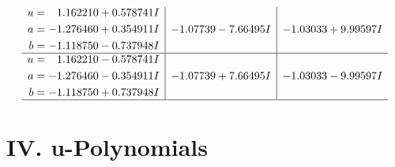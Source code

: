 \documentclass[1p]{elsarticle_modified}
\theoremstyle{definition}
\begin{document}
$$\begin{array}{c|c|c}
\begin{aligned}
u &= \phantom{-}1.162210 + 0.578741 I \\
a &= -1.276460 + 0.354911 I \\
b &= -1.118750 - 0.737948 I\end{aligned}
 & -1.07739 - 7.66495 I & -1.03033 + 9.99597 I \\ \hline\begin{aligned}
u &= \phantom{-}1.162210 - 0.578741 I \\
a &= -1.276460 - 0.354911 I \\
b &= -1.118750 + 0.737948 I\end{aligned}
 & -1.07739 + 7.66495 I & -1.03033 - 9.99597 I\\
 \hline 
 \end{array}$$\newpage
\newpage\renewcommand{\arraystretch}{1}
\centering \section*{ IV. u-Polynomials}
\end{document}
